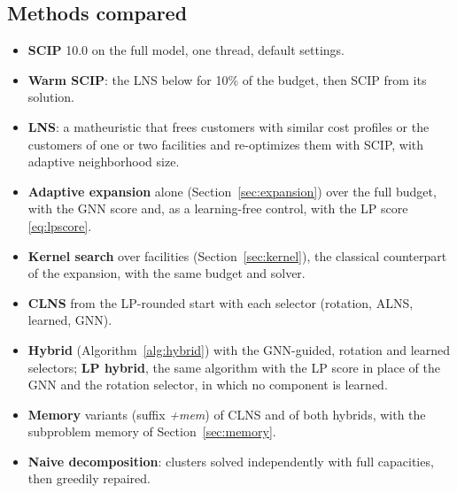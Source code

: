 \begin{table}[t]\centering\small
\caption{Data sets. All files are frozen with SHA-256 hashes before any run.}\label{tab:data}
\end{table}

\subsection{Methods compared}
\begin{itemize}
\item \textbf{SCIP} 10.0 on the full model, one thread, default settings.
\item \textbf{Warm SCIP}: the LNS below for 10\% of the budget, then SCIP from its solution.
\item \textbf{LNS}: a matheuristic that frees customers with similar cost profiles or the
customers of one or two facilities and re-optimizes them with SCIP, with adaptive neighborhood
size.
\item \textbf{Adaptive expansion} alone (Section~\ref{sec:expansion}) over the full budget, with
the GNN score and, as a learning-free control, with the LP score \eqref{eq:lpscore}.
\item \textbf{Kernel search} \citep{guastaroba2014} over facilities (Section~\ref{sec:kernel}),
the classical counterpart of the expansion, with the same budget and solver.
\item \textbf{CLNS} from the LP-rounded start with each selector (rotation, ALNS, learned, GNN).
\item \textbf{Hybrid} (Algorithm~\ref{alg:hybrid}) with the GNN-guided, rotation and learned
selectors; \textbf{LP hybrid}, the same algorithm with the LP score in place of the GNN and the
rotation selector, in which no component is learned.
\item \textbf{Memory} variants (suffix \emph{+mem}) of CLNS and of both hybrids, with the
subproblem memory of Section~\ref{sec:memory}.
\item \textbf{Naive decomposition}: clusters solved independently with full capacities, then
greedily repaired.
\end{itemize}

